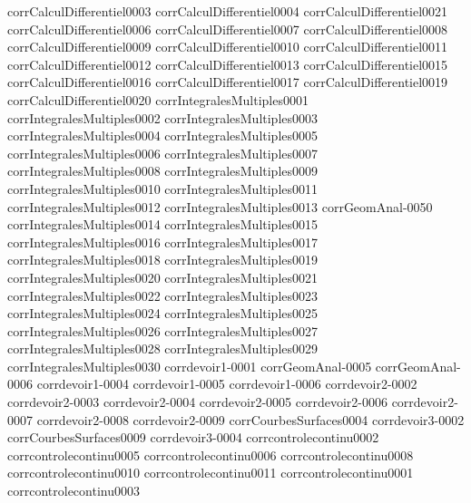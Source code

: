 {corrCalculDifferentiel0003}
{corrCalculDifferentiel0004}
{corrCalculDifferentiel0021}
{corrCalculDifferentiel0006}
{corrCalculDifferentiel0007}
{corrCalculDifferentiel0008}
{corrCalculDifferentiel0009}
{corrCalculDifferentiel0010}
{corrCalculDifferentiel0011}
{corrCalculDifferentiel0012}
{corrCalculDifferentiel0013}
{corrCalculDifferentiel0015}
{corrCalculDifferentiel0016}
{corrCalculDifferentiel0017}
{corrCalculDifferentiel0019}
{corrCalculDifferentiel0020}
{corrIntegralesMultiples0001}
{corrIntegralesMultiples0002}
{corrIntegralesMultiples0003}
{corrIntegralesMultiples0004}
{corrIntegralesMultiples0005}
{corrIntegralesMultiples0006}
{corrIntegralesMultiples0007}
{corrIntegralesMultiples0008}
{corrIntegralesMultiples0009}
{corrIntegralesMultiples0010}
{corrIntegralesMultiples0011}
{corrIntegralesMultiples0012}
{corrIntegralesMultiples0013}
{corrGeomAnal-0050}
{corrIntegralesMultiples0014}
{corrIntegralesMultiples0015}
{corrIntegralesMultiples0016}
{corrIntegralesMultiples0017}
{corrIntegralesMultiples0018}
{corrIntegralesMultiples0019}
{corrIntegralesMultiples0020}
{corrIntegralesMultiples0021}
{corrIntegralesMultiples0022}
{corrIntegralesMultiples0023}
{corrIntegralesMultiples0024}
{corrIntegralesMultiples0025}
{corrIntegralesMultiples0026}
{corrIntegralesMultiples0027}
{corrIntegralesMultiples0028}
{corrIntegralesMultiples0029}
{corrIntegralesMultiples0030}
{corrdevoir1-0001}
{corrGeomAnal-0005}
{corrGeomAnal-0006}
{corrdevoir1-0004}
{corrdevoir1-0005}
{corrdevoir1-0006}
{corrdevoir2-0002}
{corrdevoir2-0003}
{corrdevoir2-0004}
{corrdevoir2-0005}
{corrdevoir2-0006}
{corrdevoir2-0007}
{corrdevoir2-0008}
{corrdevoir2-0009}
{corrCourbesSurfaces0004}
{corrdevoir3-0002}
{corrCourbesSurfaces0009}
{corrdevoir3-0004}
{corrcontrolecontinu0002}
{corrcontrolecontinu0005}
{corrcontrolecontinu0006}
{corrcontrolecontinu0008}
{corrcontrolecontinu0010}
{corrcontrolecontinu0011}
{corrcontrolecontinu0001}
{corrcontrolecontinu0003}

